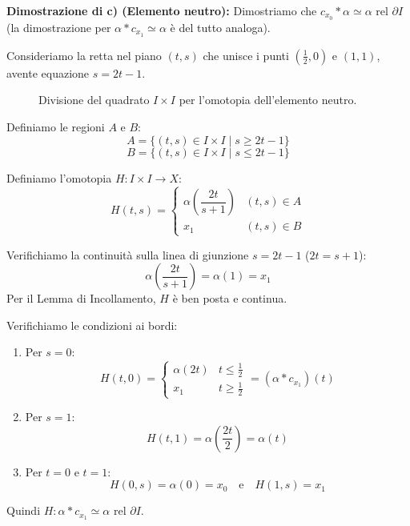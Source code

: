 \textbf{Dimostrazione di c) (Elemento neutro):}
Dimostriamo che $c_{x_0} * \alpha \simeq \alpha \text{ rel } \partial I$ (la dimostrazione per $\alpha * c_{x_1} \simeq \alpha$ è del tutto analoga).

Consideriamo la retta nel piano $(t,s)$ che unisce i punti $(\frac{1}{2}, 0)$ e $(1,1)$, avente equazione $s = 2t - 1$.

\begin{figure}[H]
    \centering
    \caption{Divisione del quadrato $I \times I$ per l'omotopia dell'elemento neutro.}
\end{figure}

Definiamo le regioni $A$ e $B$:
\[
A = \{ (t,s) \in I \times I \mid s \geqslant 2t - 1 \}
\]
\[
B = \{ (t,s) \in I \times I \mid s \leqslant 2t - 1 \}
\]

Definiamo l'omotopia $H: I \times I \to X$:
\[
H(t,s) = 
\begin{cases}
    \alpha\left( \dfrac{2t}{s+1} \right) & (t,s) \in A \\[1em]
    x_1 & (t,s) \in B
\end{cases}
\]

Verifichiamo la continuità sulla linea di giunzione $s = 2t - 1$ ($2t = s + 1$):
\[
\alpha\left( \frac{2t}{s+1} \right) = \alpha(1) = x_1
\]
Per il Lemma di Incollamento, $H$ è ben posta e continua.

Verifichiamo le condizioni ai bordi:
\begin{enumerate}[label=\roman*)]
    \item Per $s = 0$:
    \[
    H(t,0) = 
    \begin{cases}
        \alpha(2t) & t \leqslant \frac{1}{2} \\
        x_1 & t \geqslant \frac{1}{2}
    \end{cases}
    = (\alpha * c_{x_1})(t)
    \]
    \item Per $s = 1$:
    \[
    H(t,1) = \alpha\left( \frac{2t}{2} \right) = \alpha(t)
    \]
    \item Per $t = 0$ e $t = 1$:
    \[
    H(0,s) = \alpha(0) = x_0 \quad \text{e} \quad H(1,s) = x_1
    \]
\end{enumerate}
Quindi $H: \alpha * c_{x_1} \simeq \alpha \text{ rel } \partial I$.

